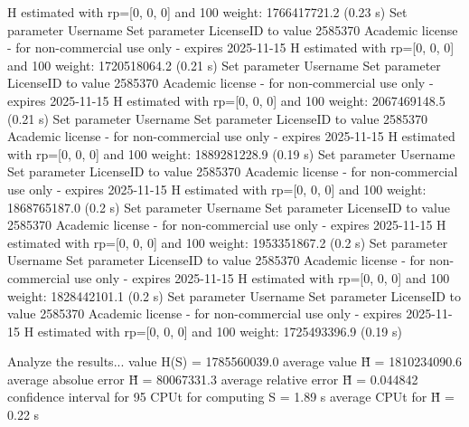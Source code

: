   H estimated with rp=[0, 0, 0] and 100 weight:  1766417721.2  (0.23 s)
Set parameter Username
Set parameter LicenseID to value 2585370
Academic license - for non-commercial use only - expires 2025-11-15
  H estimated with rp=[0, 0, 0] and 100 weight:  1720518064.2  (0.21 s)
Set parameter Username
Set parameter LicenseID to value 2585370
Academic license - for non-commercial use only - expires 2025-11-15
  H estimated with rp=[0, 0, 0] and 100 weight:  2067469148.5  (0.21 s)
Set parameter Username
Set parameter LicenseID to value 2585370
Academic license - for non-commercial use only - expires 2025-11-15
  H estimated with rp=[0, 0, 0] and 100 weight:  1889281228.9  (0.19 s)
Set parameter Username
Set parameter LicenseID to value 2585370
Academic license - for non-commercial use only - expires 2025-11-15
  H estimated with rp=[0, 0, 0] and 100 weight:  1868765187.0  (0.2 s)
Set parameter Username
Set parameter LicenseID to value 2585370
Academic license - for non-commercial use only - expires 2025-11-15
  H estimated with rp=[0, 0, 0] and 100 weight:  1953351867.2  (0.2 s)
Set parameter Username
Set parameter LicenseID to value 2585370
Academic license - for non-commercial use only - expires 2025-11-15
  H estimated with rp=[0, 0, 0] and 100 weight:  1828442101.1  (0.2 s)
Set parameter Username
Set parameter LicenseID to value 2585370
Academic license - for non-commercial use only - expires 2025-11-15
  H estimated with rp=[0, 0, 0] and 100 weight:  1725493396.9  (0.19 s)

Analyze the results...
  value H(S)                  = 1785560039.0 
  average value H̃             = 1810234090.6 
  average absolue error H̃     = 80067331.3 
  average relative error H̃    = 0.044842 
  confidence interval for 95%
  CPUt for computing S         = 1.89 s
  average CPUt for H̃           = 0.22 s

